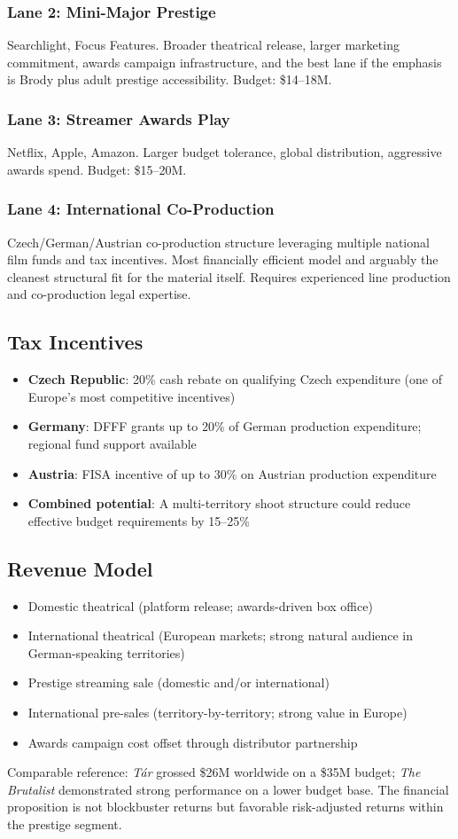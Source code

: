 \subsubsection{Lane 2: Mini-Major Prestige}
Searchlight, Focus Features. Broader theatrical release, larger marketing commitment, awards campaign infrastructure, and the best lane if the emphasis is Brody plus adult prestige accessibility. Budget: \$14--18M.

\subsubsection{Lane 3: Streamer Awards Play}
Netflix, Apple, Amazon. Larger budget tolerance, global distribution, aggressive awards spend. Budget: \$15--20M.

\subsubsection{Lane 4: International Co-Production}
Czech/German/Austrian co-production structure leveraging multiple national film funds and tax incentives. Most financially efficient model and arguably the cleanest structural fit for the material itself. Requires experienced line production and co-production legal expertise.

\subsection{Tax Incentives}

\begin{itemize}[leftmargin=*]
\item \textbf{Czech Republic}: 20\% cash rebate on qualifying Czech expenditure (one of Europe's most competitive incentives)
\item \textbf{Germany}: DFFF grants up to 20\% of German production expenditure; regional fund support available
\item \textbf{Austria}: FISA incentive of up to 30\% on Austrian production expenditure
\item \textbf{Combined potential}: A multi-territory shoot structure could reduce effective budget requirements by 15--25\%
\end{itemize}

\subsection{Revenue Model}

\begin{itemize}[leftmargin=*]
\item Domestic theatrical (platform release; awards-driven box office)
\item International theatrical (European markets; strong natural audience in German-speaking territories)
\item Prestige streaming sale (domestic and/or international)
\item International pre-sales (territory-by-territory; strong value in Europe)
\item Awards campaign cost offset through distributor partnership
\end{itemize}

Comparable reference: \textit{Tár} grossed \$26M worldwide on a \$35M budget; \textit{The Brutalist} demonstrated strong performance on a lower budget base. The financial proposition is not blockbuster returns but favorable risk-adjusted returns within the prestige segment.
